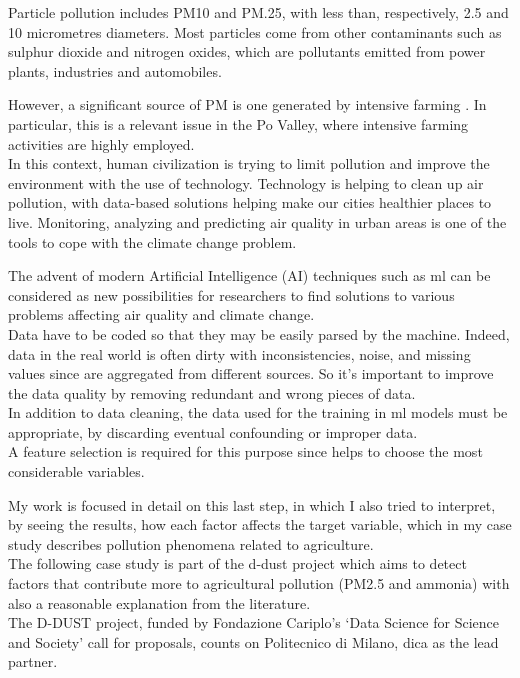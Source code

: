 Particle pollution includes PM10 and PM.25, with less than, respectively, 2.5 and 10 micrometres diameters.
Most particles come from other contaminants such as sulphur dioxide and nitrogen oxides, which are pollutants emitted from power plants, industries and automobiles.\par
However, a significant source of PM is one generated by intensive farming \cite{burkart2007diffuse}.
In particular, this is a relevant issue in the Po Valley, where intensive farming activities are highly employed.\\
In this context, human civilization is trying to limit pollution and improve the environment with the use of technology.\newline
Technology is helping to clean up air pollution, with data-based solutions helping make our cities healthier places to live.\newline
Monitoring, analyzing and predicting air quality in urban areas is one of the tools to cope with the climate change problem.\par
The advent of modern Artificial Intelligence (AI) techniques such as \gls{ml} can be considered as new possibilities for researchers to find solutions to various problems affecting air quality and climate change.
\\  
Data have to be coded so that they may be easily parsed by the machine. 
Indeed, data in the real world is often dirty with inconsistencies, noise, and missing values since are aggregated from different sources. So it's important to improve the data quality by removing redundant and wrong pieces of data.\\
In addition to data cleaning, the data used for the training in \acrshort{ml} models must be appropriate, by discarding eventual confounding or improper data.\\
A feature selection is required for this purpose since helps to choose the most considerable variables.\par
My work is focused in detail on this last step, in which I also tried to interpret, by seeing the results, how each factor affects the target variable, which in my case study describes pollution phenomena related to agriculture.\\
The following case study is part of the \gls{d-dust} project which aims to detect factors that contribute more to agricultural pollution (PM2.5 and ammonia) with also a reasonable explanation from the literature.\\
The D-DUST project, funded by Fondazione Cariplo’s ‘Data Science for Science and Society’ call for proposals, counts on Politecnico di Milano, \gls{dica} as the lead partner.\newline
